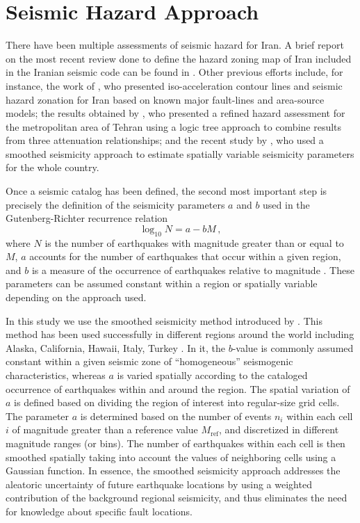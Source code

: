 
\section{Seismic Hazard Approach}

There have been multiple assessments of seismic hazard for Iran. A brief report on the most recent review done to define the hazard zoning map of Iran included in the Iranian seismic code \citep{BHRC2014} can be found in \citet{Moinfar_2012_WCEE}. Other previous efforts include, for instance, the work of \citet{Tavakoli1999}, who presented iso-acceleration contour lines and seismic hazard zonation for Iran based on known major fault-lines and area-source models; the results obtained by \citet{Ghodrati2003}, who presented a refined hazard assessment for the metropolitan area of Tehran using a logic tree approach to combine results from three attenuation relationships; and the recent study by \citet{Khodaverdian_2016_BSSA}, who used a smoothed seismicity approach to estimate spatially variable seismicity parameters for the whole country.

Once a seismic catalog has been defined, the second most important step is precisely the definition of the seismicity parameters $a$ and $b$ used in the Gutenberg-Richter recurrence relation 
% 
\begin{equation}
	\log_{10} N = a - b M \, ,
\end{equation}
% 
\noindent
where $N$ is the number of earthquakes with magnitude greater than or equal to $M$, $a$ accounts for the number of earthquakes that occur within a given region, and $b$ is a measure of the occurrence of earthquakes relative to magnitude \citep{Gutenberg1944}. These parameters can be assumed constant within a region or spatially variable depending on the approach used. 

In this study we use the smoothed seismicity method introduced by \citet{Frankel1995}. This method has been used successfully in different regions around the world including Alaska, California, Hawaii, Italy, Turkey \citep[e.g.,][]{Cao1996, Klein2001, Akinci2004, Kalkan2009, Moschetti2014}. In it, the $b$-value is commonly assumed constant within a given seismic zone of ``homogeneous'' seismogenic characteristics, whereas $a$ is varied spatially according to the cataloged occurrence of earthquakes within and around the region. The spatial variation of $a$ is defined based on dividing the region of interest into regular-size grid cells. The parameter $a$ is determined based on the number of events $n_i$ within each cell $i$ of magnitude greater than a reference value $M_{\mathrm{ref}}$, and discretized in different magnitude ranges (or bins). The number of earthquakes within each cell is then smoothed spatially taking into account the values of neighboring cells using a Gaussian function. In essence, the smoothed seismicity approach addresses the aleatoric uncertainty of future earthquake locations by using a weighted contribution of the background regional seismicity, and thus eliminates the need for knowledge about specific fault locations.

